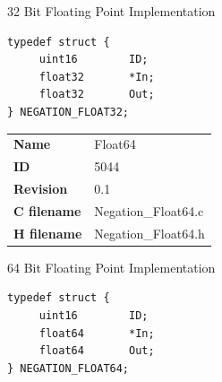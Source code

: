 32 Bit Floating Point Implementation

\begin{lstlisting}
typedef struct {
     uint16        ID;
     float32       *In;
     float32       Out;
} NEGATION_FLOAT32;
\end{lstlisting}

\ifdefined \AddTestReports
{}
\fi
{}
\nopagebreak[0]
\begin{tabular}{l l}
\textbf{Name} & Float64 \tabularnewline
\textbf{ID} & 5044 \tabularnewline
\textbf{Revision} & 0.1 \tabularnewline
\textbf{C filename} & Negation\_Float64.c \tabularnewline
\textbf{H filename} & Negation\_Float64.h \tabularnewline
\end{tabular}
\vspace{1ex}

64 Bit Floating Point Implementation

\begin{lstlisting}
typedef struct {
     uint16        ID;
     float64       *In;
     float64       Out;
} NEGATION_FLOAT64;
\end{lstlisting}

\ifdefined \AddTestReports
{}
\fi
